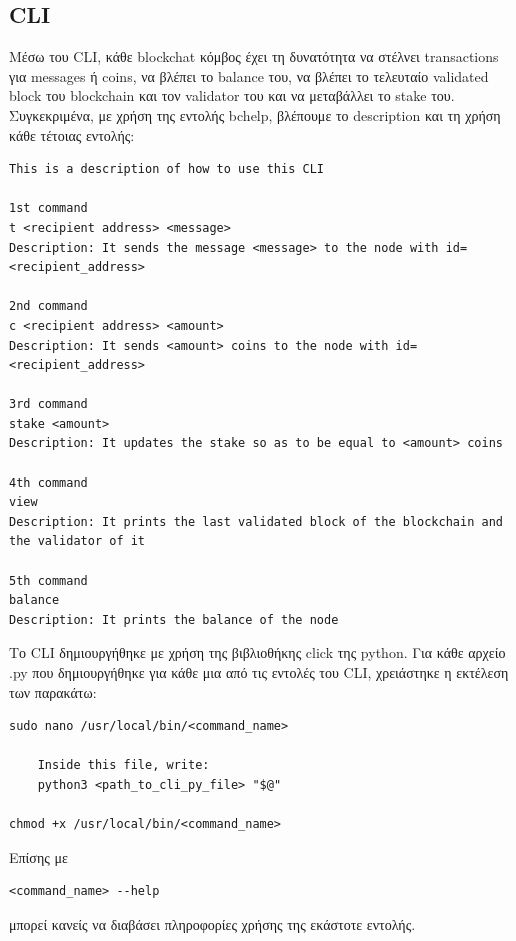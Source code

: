 \documentclass[12pt, a4paper]{article}
\begin{document}
	\subsection{CLI}
	Μέσω του CLI, κάθε blockchat κόμβος έχει τη δυνατότητα να στέλνει transactions για messages ή coins, να βλέπει το balance του, να βλέπει το τελευταίο validated block του blockchain και τον validator του και να μεταβάλλει το stake του. Συγκεκριμένα, με χρήση της εντολής bchelp, βλέπουμε το description και τη χρήση κάθε τέτοιας εντολής:
	\begin{lstlisting}[style=text]
This is a description of how to use this CLI

1st command
t <recipient address> <message>
Description: It sends the message <message> to the node with id=<recipient_address>

2nd command
c <recipient address> <amount>
Description: It sends <amount> coins to the node with id=<recipient_address>

3rd command
stake <amount>
Description: It updates the stake so as to be equal to <amount> coins

4th command
view
Description: It prints the last validated block of the blockchain and the validator of it

5th command
balance
Description: It prints the balance of the node
	\end{lstlisting}
Το CLI δημιουργήθηκε με χρήση της βιβλιοθήκης click της python. Για κάθε αρχείο .py που δημιουργήθηκε για κάθε μια από τις εντολές του CLI, χρειάστηκε η εκτέλεση των παρακάτω:
\begin{lstlisting}[style=text]
sudo nano /usr/local/bin/<command_name>
	
	Inside this file, write:
	python3 <path_to_cli_py_file> "$@"

chmod +x /usr/local/bin/<command_name>
\end{lstlisting}
Επίσης με 
\begin{lstlisting}[style=text]
<command_name> --help
\end{lstlisting}
μπορεί κανείς να διαβάσει πληροφορίες χρήσης της εκάστοτε εντολής.
\end{document}
